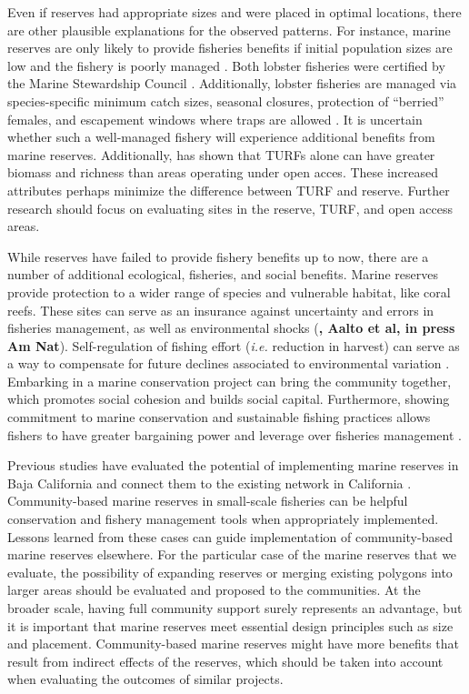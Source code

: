 \documentclass{frontiersSCNS}
\theoremstyle{definition}
\theoremstyle{definition}
\theoremstyle{definition}
\theoremstyle{remark}
\begin{document}
Even if reserves had appropriate sizes and were placed in optimal
locations, there are other plausible explanations for the observed
patterns. For instance, marine reserves are only likely to provide
fisheries benefits if initial population sizes are low and the fishery
is poorly managed \citep{hilborn_2006}. Both lobster fisheries were
certified by the Marine Stewardship Council \citep{prezramrez_2016-J1}.
Additionally, lobster fisheries are managed via species-specific minimum
catch sizes, seasonal closures, protection of ``berried'' females, and
escapement windows where traps are allowed \citep{dof_website_1993}. It
is uncertain whether such a well-managed fishery will experience
additional benefits from marine reserves. Additionally,
\citet{gelcich_2008} has shown that TURFs alone can have greater biomass
and richness than areas operating under open acces. These increased
attributes perhaps minimize the difference between TURF and reserve.
Further research should focus on evaluating sites in the reserve, TURF,
and open access areas.

While reserves have failed to provide fishery benefits up to now, there
are a number of additional ecological, fisheries, and social benefits.
Marine reserves provide protection to a wider range of species and
vulnerable habitat, like coral reefs. These sites can serve as an
insurance against uncertainty and errors in fisheries management, as
well as environmental shocks
\citep{hilborn_2004,hilborn_2006,micheli_2012-EU} (\textbf{, Aalto et
al, in press Am Nat}). Self-regulation of fishing effort (\emph{i.e.}
reduction in harvest) can serve as a way to compensate for future
declines associated to environmental variation \citep{finkbeiner_2018}.
Embarking in a marine conservation project can bring the community
together, which promotes social cohesion and builds social capital.
Furthermore, showing commitment to marine conservation and sustainable
fishing practices allows fishers to have greater bargaining power and
leverage over fisheries management \citep{prezramrez_2012}.

Previous studies have evaluated the potential of implementing marine
reserves in Baja California and connect them to the existing network in
California \citep{arafehdalmau_2017}. Community-based marine reserves in
small-scale fisheries can be helpful conservation and fishery management
tools when appropriately implemented. Lessons learned from these cases
can guide implementation of community-based marine reserves elsewhere.
For the particular case of the marine reserves that we evaluate, the
possibility of expanding reserves or merging existing polygons into
larger areas should be evaluated and proposed to the communities. At the
broader scale, having full community support surely represents an
advantage, but it is important that marine reserves meet essential
design principles such as size and placement. Community-based marine
reserves might have more benefits that result from indirect effects of
the reserves, which should be taken into account when evaluating the
outcomes of similar projects.
\end{document}
